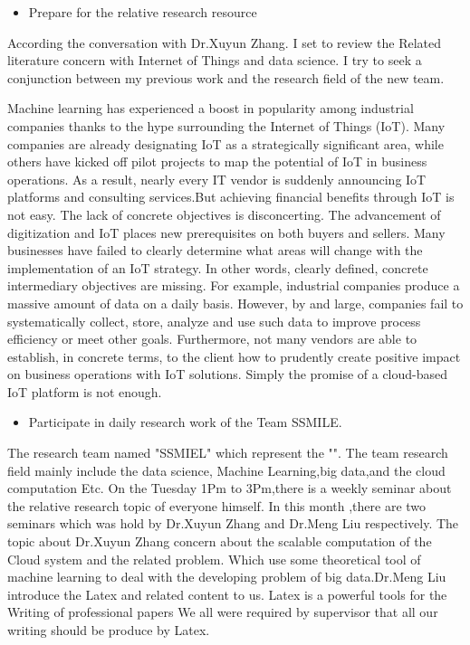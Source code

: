 \documentclass[12pt]{article}
\begin{document}
\begin{itemize}
    \item Prepare for the relative research resource
\end{itemize}
\par \vspace{-0.4cm}
According the conversation with Dr.Xuyun Zhang. I set to  review the Related literature concern with Internet of Things and data science. I try to seek a conjunction between my previous work and the research field of the new team.
\par
Machine learning has experienced a boost in popularity among industrial companies thanks to the hype surrounding the Internet of Things (IoT). Many companies are already designating IoT as a strategically significant area, while others have kicked off pilot projects to map the potential of IoT in business operations.
As a result, nearly every IT vendor is suddenly announcing IoT platforms and consulting services.But achieving financial benefits through IoT is not easy. The lack of concrete objectives is disconcerting. The advancement of digitization and IoT places new prerequisites on both buyers and sellers. Many businesses have failed to clearly determine what areas will change with the implementation of an IoT strategy.
In other words, clearly defined, concrete intermediary objectives are missing. For example, industrial companies produce a massive amount of data on a daily basis. However, by and large, companies fail to systematically collect, store, analyze and use such data to improve process efficiency or meet other goals.
Furthermore, not many vendors are able to establish, in concrete terms, to the client how to prudently create positive impact on business operations with IoT solutions. Simply the promise of a cloud-based IoT platform is not enough.

 
\begin{itemize}
    \item Participate in daily research work of the Team SSMILE.
\end{itemize}  
\par \vspace{-0.4cm}
The research team named "SSMIEL" which represent the "". The team research field mainly include the data science, Machine Learning,big data,and the cloud computation Etc. On the Tuesday 1Pm to 3Pm,there is a weekly seminar about the relative research topic of everyone himself. In this month ,there are two seminars which was hold by Dr.Xuyun Zhang and Dr.Meng Liu respectively. The topic about Dr.Xuyun Zhang concern about the scalable computation of the Cloud system and the related problem. Which use some theoretical tool of machine learning to deal with the developing problem of big data.Dr.Meng Liu introduce the Latex and related content to us. Latex is a powerful tools for the Writing of professional papers
We all were required by supervisor that all our writing should be produce by Latex.
\end{document}
